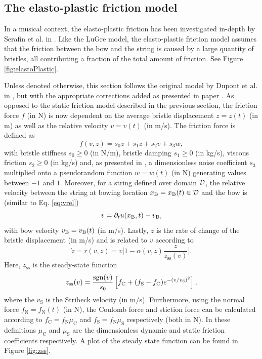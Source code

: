 \subsection{The elasto-plastic friction model}\label{sec:elastoPlastic}
In a musical context, the elasto-plastic friction has been investigated in-depth by Serafin et al. in \cite{Serafin2003, Serafin2004, Avanzini2005}. Like the LuGre model, the elasto-plastic friction model assumes that the friction between the bow and the string is caused by a large quantity of bristles, all contributing a fraction of the total amount of friction. See Figure \ref{fig:elastoPlastic}.



Unless denoted otherwise, this section follows the original model by Dupont et al. in \cite{Dupont2002}, but with the appropriate corrections added as presented in paper \citeP[C]. As opposed to the static friction model described in the previous section, the friction force $f$ (in N) is now dependent on the average bristle displacement $z = z(t)$ (in m) as well as the relative velocity $v = v(t)$ (in m/s). The friction force is defined as
\begin{equation}\label{eq:elastoPlasticForce}
    f(v, z) = s_0z + s_1\dot z + s_2v + s_3w,
\end{equation}
with bristle stiffness $s_0 \geq 0$ (in N/m), bristle damping $s_1 \geq 0$ (in kg/s), viscous friction $s_2 \geq 0$ (in kg/s) and, as presented in \cite{Serafin2004}, a dimensionless noise coefficient $s_3$ multiplied onto a pseudorandom function $w = w(t)$ (in N) generating values between $-1$ and $1$. Moreover, for a string defined over domain $\mathcal{D}$, the relative velocity between the string at bowing location $x_{\text{B}} = x_{\text{B}}(t) \in \mathcal{D}$ and the bow is (similar to Eq. \eqref{eq:vrel})
\begin{equation}\label{eq:vrelElasto}
    v = \partial_t u(x_{\text{B}},t) - v_{\text{B}},
\end{equation}
with bow velocity $v_{\text{B}} = v_{\text{B}}(t)$ (in m/s). Lastly, $\dot z$ is the rate of change of the bristle displacement (in m/s) and is related to $v$ according to
\begin{equation}\label{eq:zdot}
    \dot z = r(v, z) = v \bigg[ 1-  \alpha(v, z)\frac{z}{z_\text{ss}(v)}\bigg].
\end{equation}
Here, $z_\text{ss}$ is the steady-state function
\begin{equation}\label{eq:zss}
    z_\text{ss}(v) = \frac{\text{sgn}(v)}{s_0}\left[f_\text{C}+(f_\text{S}-f_\text{C})e^{-(v/v_\text{S})^2}\right],
\end{equation}
where the $v_\text{S}$ is the Stribeck velocity (in m/s). Furthermore, using the normal force $f_\text{N} = f_\text{N}(t)$ (in N), the Coulomb force and stiction force can be calculated according to $f_\text{C} = f_\text{N}\mu_\text{C}$ and $f_\text{S} = f_\text{N}\mu_\text{S}$ respectively (both in N). In these definitions $\mu_\text{C}$ and $\mu_\text{S}$ are the dimensionless dynamic and static friction coefficients respectively. A plot of the steady state function can be found in Figure \ref{fig:zss}.


